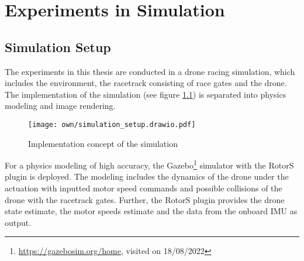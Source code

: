 \chapter{Experiments in Simulation}
\label{maintwo}

\section{Simulation Setup} \label{sec:sim_setup}
The experiments in this thesis 
are conducted in a drone racing simulation,
which includes the environment, 
the racetrack consisting of race gates 
and the drone.
The implementation of the simulation (see figure \ref{fig:simulation_setup})
is separated into physics modeling and image rendering.
\begin{figure}%
    \centering
    \texttt{[image: own/simulation\_setup.drawio.pdf]}
    \caption[
        Implementation concept of the simulation
    ]{
        Implementation concept of the simulation
    \label{fig:simulation_setup}
    }
\end{figure}

For a physics modeling of high accuracy,
the Gazebo\footnote{\url{https://gazebosim.org/home}, visited on 18/08/2022} 
simulator
with the RotorS \cite{Furrer2016} plugin is deployed.
The modeling includes the dynamics of the drone under 
the actuation with inputted motor speed commands
and possible collisions of the drone with the racetrack gates.
Further, the RotorS plugin provides the
drone state estimate, the motor speeds estimate and the
data from the onboard IMU as output.



